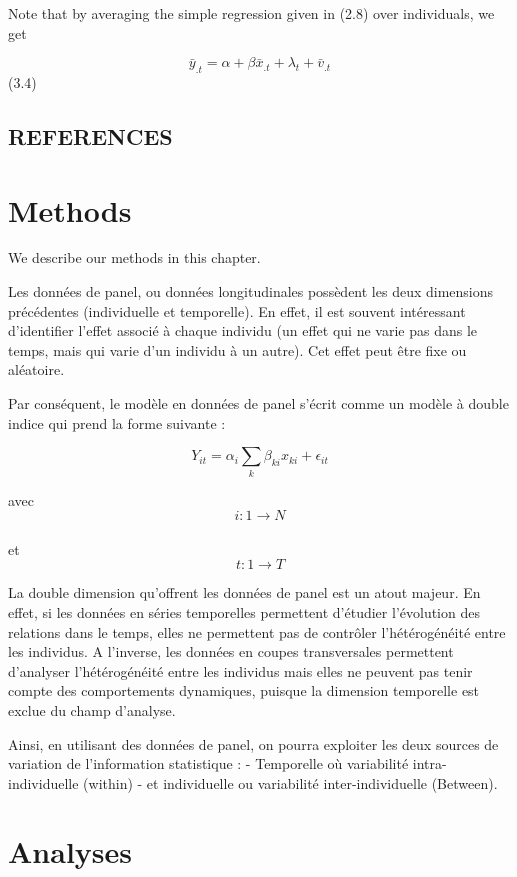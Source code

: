 \documentclass[
]{book}
\begin{document}
Note that by averaging the simple regression given in (2.8) over individuals, we get

\begin{equation}
\bar{y}_{. t}=\alpha+\beta \bar{x}_{. t}+\lambda_{t}+\bar{v}_{. t}
\end{equation} (3.4)

\hypertarget{references}{%
\section{REFERENCES}\label{references}}

\hypertarget{methods}{%
\chapter{Methods}\label{methods}}

We describe our methods in this chapter.

Les données de panel, ou données longitudinales possèdent les deux dimensions précédentes (individuelle et temporelle). En effet, il est souvent intéressant d'identifier l'effet associé à chaque individu (un effet qui ne varie pas dans le temps, mais qui varie d'un individu à un autre). Cet effet peut être fixe ou aléatoire.

Par conséquent, le modèle en données de panel s'écrit comme un modèle à double indice qui prend la forme suivante :

\[ Y_{it}= \alpha_i\sum_{k}\beta_{ki}x_{ki}+ \epsilon_{it} \]

avec
\[ i:1 \rightarrow N \]\\
et
\[ t:1 \rightarrow T \]

La double dimension qu'offrent les données de panel est un atout majeur. En effet, si les données en séries temporelles permettent d'étudier l'évolution des relations dans le temps, elles ne permettent pas de contrôler l'hétérogénéité entre les individus. A l'inverse, les données en coupes transversales permettent d'analyser l'hétérogénéité entre les individus mais elles ne peuvent pas tenir compte des comportements dynamiques, puisque la dimension temporelle est exclue du champ d'analyse.

Ainsi, en utilisant des données de panel, on pourra exploiter les deux sources de variation de l'information statistique :
- Temporelle où variabilité intra-individuelle (within)
- et individuelle ou variabilité inter-individuelle (Between).

\hypertarget{analyses}{%
\chapter{Analyses}\label{analyses}}
\end{document}

